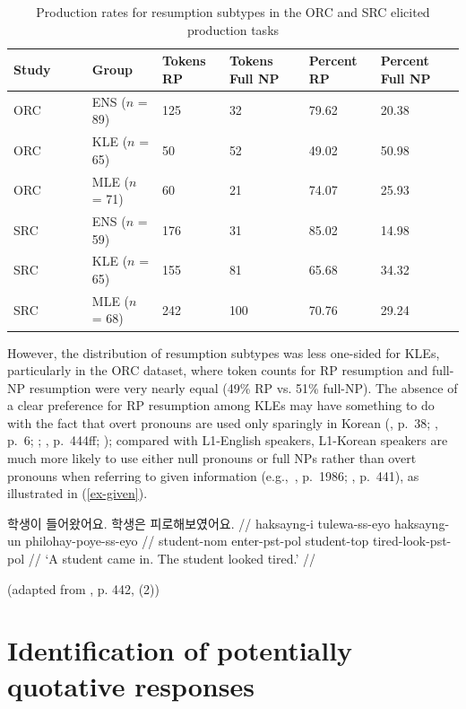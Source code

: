\begin{table}
\caption{Production rates for resumption subtypes in the ORC and SRC elicited production tasks}\label{tab:ept-resumption-type}
\raggedright{}
\begin{tabularx}{\linewidth}{llYYYY}\toprule
Study~~~~ & Group & Tokens RP & Tokens Full NP & Percent RP & Percent Full NP \\\midrule
ORC & ENS ($n$ = 89) & 125 & 32 & 79.62 & 20.38 \\
ORC & KLE ($n$ = 65) & 50 & 52 & 49.02 & 50.98 \\
ORC & MLE ($n$ = 71) & 60 & 21 & 74.07 & 25.93 \\
SRC & ENS ($n$ = 59) & 176 & 31 & 85.02 & 14.98 \\
SRC & KLE ($n$ = 65) & 155 & 81 & 65.68 & 34.32 \\
SRC & MLE ($n$ = 68) & 242 & 100 & 70.76 & 29.24 \\\bottomrule
\end{tabularx}
\vspace{-12pt}
\end{table}

\noindent However, the distribution of resumption subtypes was less one-sided for KLEs, particularly in the ORC dataset, where token counts for RP resumption and full-NP resumption were very nearly equal (49\% RP vs. 51\% full-NP). The absence of a clear preference for RP resumption among KLEs may have something to do with the fact that overt pronouns are used only sparingly in Korean (\cite{han2006}, p.~38; \cite{hwang2022}, p.~6; \cite{kim1989,kim1990}; \cite{kim.gruter2019}, p.~444ff; \cite{lee.etal1997}); compared with L1-English speakers, L1-Korean speakers are much more likely to use either null pronouns or full NPs rather than overt pronouns when referring to given information (e.g.,~\cite{kang2004}, p.~1986; \cite{kang2009}, p.~441), as illustrated in (\ref{ex-given}). 

\ex[everygla=\ko] 
\begingl 
\gla 학생이 들어왔어요. 학생은 피로해보였어요. //
\glb haksayng-i tulewa-ss-eyo haksayng-un philohay-poye-ss-eyo //
\glc student-{\sc nom} enter-{\sc pst-pol} student-{\sc top} tired-look-{\sc pst-pol} //
\glft `A student came in. The student looked tired.' //
\endgl\par\nobreak\vspace{5pt}\label{ex-given}
\hfill (adapted from \cite{kang2009}, p. 442, (2))
\xe

\section{Identification of potentially quotative responses}\label{ept-quotative}

